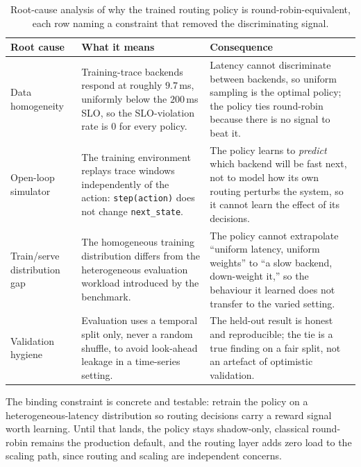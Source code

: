 \begin{table}[H]
  \centering
  \caption[Why the routing policy is round-robin-equivalent]{Root-cause analysis of why the trained routing policy is round-robin-equivalent, each row naming a constraint that removed the discriminating signal.}
  \label{tab:disc:rootcause}
  \small
  \begin{tabularx}{\linewidth}{@{}p{3.2cm}YY@{}}
    \toprule
    \headrow
    \textbf{Root cause} & \textbf{What it means} & \textbf{Consequence} \\
    \midrule
    Data homogeneity
      & Training-trace backends respond at roughly $9.7$\,ms, uniformly below the
        $200$\,ms SLO, so the SLO-violation rate is $0$ for every policy.
      & Latency cannot discriminate between backends, so uniform sampling is the
        optimal policy; the policy ties round-robin because there is no signal to
        beat it. \\[3pt]
    Open-loop simulator
      & The training environment replays trace windows independently of the action:
        \texttt{step(action)} does not change \texttt{next\_state}.
      & The policy learns to \emph{predict} which backend will be fast next, not to
        model how its own routing perturbs the system, so it cannot learn the effect
        of its decisions. \\[3pt]
    Train/serve distribution gap
      & The homogeneous training distribution differs from the heterogeneous
        evaluation workload introduced by the benchmark.
      & The policy cannot extrapolate ``uniform latency, uniform weights'' to
        ``a slow backend, down-weight it,'' so the behaviour it learned does not
        transfer to the varied setting. \\[3pt]
    Validation hygiene
      & Evaluation uses a temporal split only, never a random shuffle, to avoid
        look-ahead leakage in a time-series setting.
      & The held-out result is honest and reproducible; the tie is a true finding on
        a fair split, not an artefact of optimistic validation. \\
    \bottomrule
  \end{tabularx}
\end{table}

The binding constraint is concrete and testable: retrain the policy on a
heterogeneous-latency distribution so routing decisions carry a reward signal worth
learning. Until that lands, the policy stays shadow-only, classical round-robin remains
the production default, and the routing layer adds zero load to the scaling path, since
routing and scaling are independent concerns.

